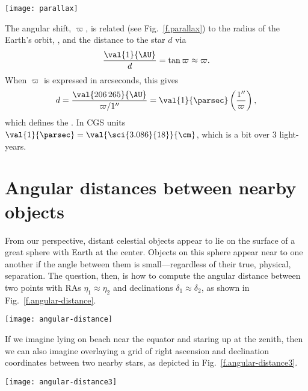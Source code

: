 \begin{figure*}[htb]
\texttt{[image: parallax]}
\caption[The parallax angle of a star]{The parallax angle $\varpi$ of a star induced by Earth's motion around the Sun.}
\label{f.parallax}
\end{figure*}

The angular shift, $\varpi$, is related (see Fig.~\ref{f.parallax}) to the radius of the Earth's orbit, , and the distance to the star $d$ via
\[
\frac{\val{1}{\AU}}{d} = \tan\varpi \approx \varpi.
\]
When $\varpi$ is expressed in arcseconds, this gives
\begin{equation}\label{e.parallax}
d = \frac{\val{206\,265}{\AU}}{\varpi/1''} = \val{1}{\parsec}\left(\frac{1''}{\varpi}\right) ,
\end{equation}
which defines the .  In CGS units $\val{1}{\parsec} = \val{\sci{3.086}{18}}{\cm}$, which is a bit over 3 light-years.

\section{Angular distances between nearby objects}

From our perspective, distant celestial objects appear to lie on the surface of a great sphere with Earth at the center. Objects on this sphere appear near to one another if the angle between them is small---regardless of their true, physical, separation. The question, then, is how to compute the angular distance between two points with RAs $\eta_{1} \approx \eta_{2}$ and declinations $\delta_{1}\approx\delta_{2}$, as shown in Fig.~\ref{f.angular-distance}.
\begin{marginfigure}
\texttt{[image: angular-distance]}
\caption[Angular distance between two points on a sphere]{Two locations on the sphere separated by a distance $\theta$.}
\label{f.angular-distance}
\end{marginfigure}

If we imagine lying on beach near the equator and staring up at the zenith, then we can also imagine overlaying a grid of right ascension and declination coordinates between two nearby stars, as depicted in Fig.~\ref{f.angular-distance3}.
\begin{marginfigure}
\texttt{[image: angular-distance3]}
\caption[Angular distance between two points near the celestial equator]{Angular distance between two nearby points near the celestial equator.}
\label{f.angular-distance3}
\end{marginfigure}

